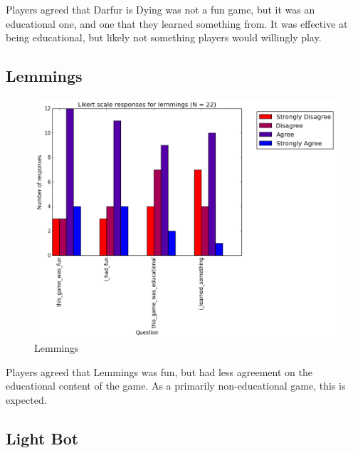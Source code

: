 				Players agreed that Darfur is Dying was not a fun game, but it was an educational one, and one that they learned something from. It was effective at being educational, but likely not something players would willingly play.

			\subsection{Lemmings}

				\begin{figure}[] 
				\centering 
				\includegraphics[width=\textwidth, height=.4\textheight, keepaspectratio=true]{lemmings_likert.png} 
				\caption{Lemmings}
				\end{figure}

				Players agreed that Lemmings was fun, but had less agreement on the educational content of the game. As a primarily non-educational game, this is expected.

			\subsection{Light Bot}

